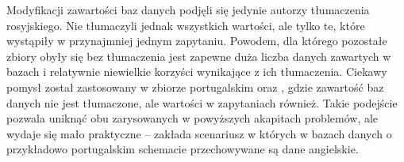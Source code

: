 Modyfikacji zawartości baz danych podjęli się jedynie autorzy tłumaczenia rosyjskiego. Nie tłumaczyli jednak wszystkich wartości, ale tylko te, które wystąpiły w przynajmniej jednym zapytaniu. Powodem, dla którego pozostałe zbiory obyły się bez tłumaczenia jest zapewne duża liczba danych zawartych w bazach i relatywnie niewielkie korzyści wynikające z ich tłumaczenia. Ciekawy pomysł został zastosowany w zbiorze portugalskim oraz , gdzie zawartość baz danych nie jest tłumaczone, ale wartości w zapytaniach również. Takie podejście pozwala uniknąć obu zarysowanych w powyższych akapitach problemów, ale wydaje się mało praktyczne -- zakłada scenariusz w których w bazach danych o przykładowo portugalskim schemacie przechowywane są dane angielskie.
